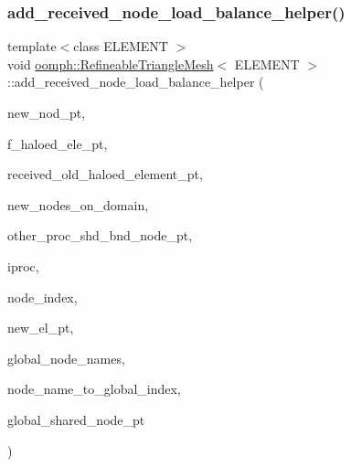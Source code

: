 \subsubsection{\texorpdfstring{add\+\_\+received\+\_\+node\+\_\+load\+\_\+balance\+\_\+helper()}{add\_received\_node\_load\_balance\_helper()}}
{\footnotesize\ttfamily template$<$class E\+L\+E\+M\+E\+NT $>$ \\
void \hyperlink{classoomph_1_1RefineableTriangleMesh}{oomph\+::\+Refineable\+Triangle\+Mesh}$<$ E\+L\+E\+M\+E\+NT $>$\+::add\+\_\+received\+\_\+node\+\_\+load\+\_\+balance\+\_\+helper (\begin{DoxyParamCaption}\item[{\hyperlink{classoomph_1_1Node}{Node} $\ast$\&}]{new\+\_\+nod\+\_\+pt,  }\item[{\hyperlink{classoomph_1_1Vector}{Vector}$<$ \hyperlink{classoomph_1_1Vector}{Vector}$<$ \hyperlink{classoomph_1_1FiniteElement}{Finite\+Element} $\ast$$>$ $>$ \&}]{f\+\_\+haloed\+\_\+ele\+\_\+pt,  }\item[{\hyperlink{classoomph_1_1Vector}{Vector}$<$ \hyperlink{classoomph_1_1Vector}{Vector}$<$ std\+::map$<$ unsigned, \hyperlink{classoomph_1_1FiniteElement}{Finite\+Element} $\ast$$>$ $>$ $>$ \&}]{received\+\_\+old\+\_\+haloed\+\_\+element\+\_\+pt,  }\item[{\hyperlink{classoomph_1_1Vector}{Vector}$<$ \hyperlink{classoomph_1_1Node}{Node} $\ast$$>$ \&}]{new\+\_\+nodes\+\_\+on\+\_\+domain,  }\item[{\hyperlink{classoomph_1_1Vector}{Vector}$<$ \hyperlink{classoomph_1_1Vector}{Vector}$<$ \hyperlink{classoomph_1_1Vector}{Vector}$<$ std\+::map$<$ unsigned, \hyperlink{classoomph_1_1Node}{Node} $\ast$$>$ $>$ $>$ $>$ \&}]{other\+\_\+proc\+\_\+shd\+\_\+bnd\+\_\+node\+\_\+pt,  }\item[{unsigned \&}]{iproc,  }\item[{unsigned \&}]{node\+\_\+index,  }\item[{\hyperlink{classoomph_1_1FiniteElement}{Finite\+Element} $\ast$const \&}]{new\+\_\+el\+\_\+pt,  }\item[{\hyperlink{classoomph_1_1Vector}{Vector}$<$ \hyperlink{classoomph_1_1Vector}{Vector}$<$ \hyperlink{classoomph_1_1Vector}{Vector}$<$ unsigned $>$ $>$ $>$ \&}]{global\+\_\+node\+\_\+names,  }\item[{std\+::map$<$ \hyperlink{classoomph_1_1Vector}{Vector}$<$ unsigned $>$, unsigned $>$ \&}]{node\+\_\+name\+\_\+to\+\_\+global\+\_\+index,  }\item[{\hyperlink{classoomph_1_1Vector}{Vector}$<$ \hyperlink{classoomph_1_1Node}{Node} $\ast$$>$ \&}]{global\+\_\+shared\+\_\+node\+\_\+pt }\end{DoxyParamCaption})\hspace{0.3cm}{\ttfamily [protected]}}



